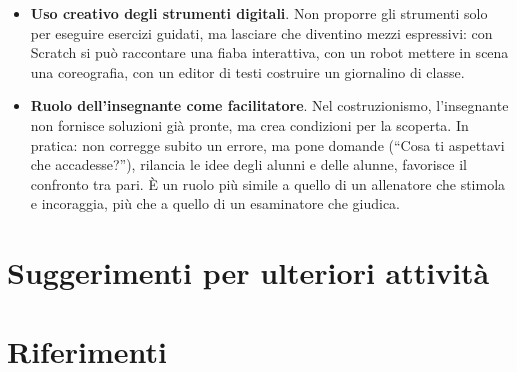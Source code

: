 \begin{itemize}
\item
  \textbf{Uso creativo degli strumenti digitali}. Non proporre gli strumenti solo per eseguire esercizi guidati, ma lasciare che diventino mezzi espressivi: con Scratch si può raccontare una fiaba interattiva, con un robot mettere in scena una coreografia, con un editor di testi costruire un giornalino di classe.

\item
  \textbf{Ruolo dell'insegnante come facilitatore}. Nel costruzionismo, l'insegnante non fornisce soluzioni già pronte, ma crea condizioni per la scoperta. In pratica: non corregge subito un errore, ma pone domande (``Cosa ti aspettavi che accadesse?''), rilancia le idee degli alunni e delle alunne, favorisce il confronto tra pari. È un ruolo più simile a quello di un allenatore che stimola e incoraggia, più che a quello di un esaminatore che giudica.
\end{itemize}


\section{Suggerimenti per ulteriori attività}\label{suggerimenti-attivita-cap1}

\printbibliography[heading=none,keyword={cap1},category={attivita}]

\section{Riferimenti}\label{riferimenti}

\printbibliography[heading=none,keyword={cap1},notcategory={attivita}]
